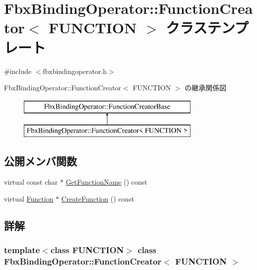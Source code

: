 \hypertarget{class_fbx_binding_operator_1_1_function_creator}{}\section{Fbx\+Binding\+Operator\+:\+:Function\+Creator$<$ F\+U\+N\+C\+T\+I\+ON $>$ クラステンプレート}
\label{class_fbx_binding_operator_1_1_function_creator}


{\ttfamily \#include $<$fbxbindingoperator.\+h$>$}

Fbx\+Binding\+Operator\+:\+:Function\+Creator$<$ F\+U\+N\+C\+T\+I\+ON $>$ の継承関係図\begin{figure}[H]
\begin{center}
\leavevmode
\includegraphics[height=2.000000cm]{class_fbx_binding_operator_1_1_function_creator}
\end{center}
\end{figure}
\subsection*{公開メンバ関数}
\begin{DoxyCompactItemize}
\item 
virtual const char $\ast$ \hyperlink{class_fbx_binding_operator_1_1_function_creator_ae54e4bf8030e91bcd1b6fe5e9126be9d}{Get\+Function\+Name} () const
\item 
virtual \hyperlink{class_fbx_binding_operator_1_1_function}{Function} $\ast$ \hyperlink{class_fbx_binding_operator_1_1_function_creator_a0d7fd7fb26969b0b2a46b6a44e6e2ac8}{Create\+Function} () const
\end{DoxyCompactItemize}


\subsection{詳解}
\subsubsection*{template$<$class F\+U\+N\+C\+T\+I\+ON$>$\newline
class Fbx\+Binding\+Operator\+::\+Function\+Creator$<$ F\+U\+N\+C\+T\+I\+O\+N $>$}

